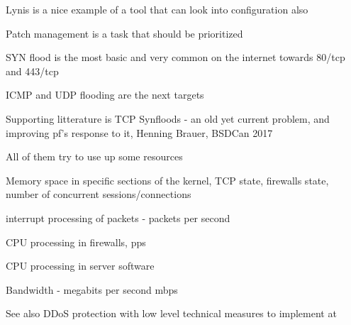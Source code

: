 \documentclass[Screen16to9,17pt]{foils}
\begin{document}
\begin{list2}
\item Lynis is a nice example of a tool that can look into configuration also
\item Patch management is a task that should be prioritized
\end{list2}




\begin{list2}
\item SYN flood is the most basic and very common on the internet towards 80/tcp and 443/tcp
\item ICMP and UDP flooding are the next targets
\item Supporting litterature is TCP Synfloods - an old yet current problem, and improving pf's response to it, Henning Brauer, BSDCan 2017
\item All of them try to use up some resources
\begin{list2}
\item Memory space in specific sections of the kernel, TCP state, firewalls state, number of concurrent sessions/connections
\item interrupt processing of packets - packets per second
\item CPU processing in firewalls, pps
\item CPU processing in server software
\item Bandwidth - megabits per second mbps
\end{list2}
\end{list2}

See also DDoS protection with low level technical measures to implement at\\
{\footnotesize {}}




\end{document}
